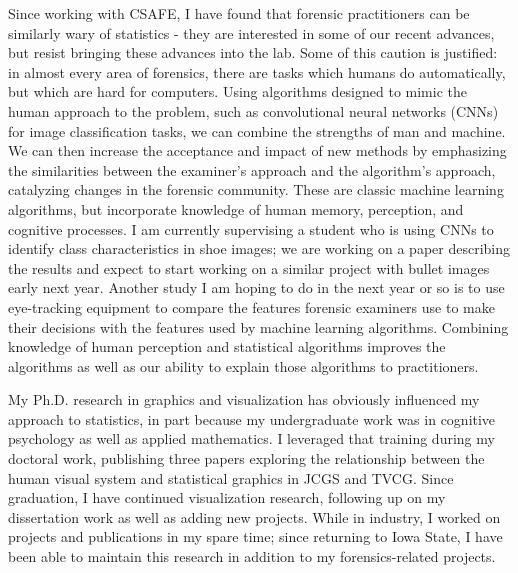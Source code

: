 \documentclass[12pt, letterpaper, sans]{moderncv}
\begin{document}
Since working with CSAFE, I have found that forensic practitioners can be similarly wary of statistics - they are interested in some of our recent advances, but resist bringing these advances into the lab. Some of this caution is justified: in almost every area of forensics, there are tasks which humans do automatically, but which are hard for computers. Using algorithms designed to mimic the human approach to the problem, such as convolutional neural networks (CNNs) for image classification tasks, we can combine the strengths of man and machine. We can then increase the acceptance and impact of new methods by emphasizing the similarities between the examiner's approach and the algorithm's approach, catalyzing changes in the forensic community. These are classic machine learning algorithms, but incorporate knowledge of human memory, perception, and cognitive processes. I am currently supervising a student who is using CNNs to identify class characteristics in shoe images; we are working on a paper describing the results and expect to start working on a similar project with bullet images early next year. Another study I am hoping to do in the next year or so is to use eye-tracking equipment to compare the features forensic examiners use to make their decisions with the features used by machine learning algorithms. Combining knowledge of human perception and statistical algorithms improves the algorithms as well as our ability to explain those algorithms to practitioners. 

My Ph.D. research in graphics and visualization has obviously influenced my approach to statistics, in part because my undergraduate work was in cognitive psychology as well as applied mathematics. I leveraged that training during my doctoral work, publishing three papers exploring the relationship between the human visual system and statistical graphics in JCGS and TVCG. Since graduation, I have continued visualization research, following up on my dissertation work as well as adding new projects. While in industry, I worked on projects and publications in my spare time; since returning to Iowa State, I have been able to maintain this research in addition to my forensics-related projects. 
\end{document}
